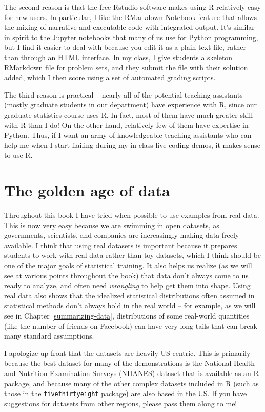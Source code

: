 \documentclass[12pt,]{book}
\begin{document}
The second reason is that the free Rstudio software makes using R relatively easy for new users. In particular, I like the RMarkdown Notebook feature that allows the mixing of narrative and executable code with integrated output. It's similar in spirit to the Jupyter notebooks that many of us use for Python programming, but I find it easier to deal with because you edit it as a plain text file, rather than through an HTML interface. In my class, I give students a skeleton RMarkdown file for problem sets, and they submit the file with their solution added, which I then score using a set of automated grading scripts.

The third reason is practical -- nearly all of the potential teaching assistants (mostly graduate students in our department) have experience with R, since our graduate statistics course uses R. In fact, most of them have much greater skill with R than I do! On the other hand, relatively few of them have expertise in Python. Thus, if I want an army of knowledgeable teaching assistants who can help me when I start flailing during my in-class live coding demos, it makes sense to use R.

\hypertarget{the-golden-age-of-data}{%
\section{The golden age of data}\label{the-golden-age-of-data}}

Throughout this book I have tried when possible to use examples from real data. This is now very easy because we are swimming in open datasets, as governments, scientists, and companies are increasingly making data freely available. I think that using real datasets is important because it prepares students to work with real data rather than toy datasets, which I think should be one of the major goals of statistical training. It also helps us realize (as we will see at various points throughout the book) that data don't always come to us ready to analyze, and often need \emph{wrangling} to help get them into shape. Using real data also shows that the idealized statistical distributions often assumed in statistical methods don't always hold in the real world -- for example, as we will see in Chapter \ref{summarizing-data}, distributions of some real-world quantities (like the number of friends on Facebook) can have very long tails that can break many standard assumptions.

I apologize up front that the datasets are heavily US-centric. This is primarily because the best dataset for many of the demonstrations is the National Health and Nutrition Examination Surveys (NHANES) dataset that is available as an R package, and because many of the other complex datasets included in R (such as those in the \texttt{fivethirtyeight} package) are also based in the US. If you have suggestions for datasets from other regions, please pass them along to me!
\end{document}
